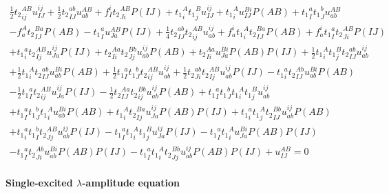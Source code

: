 \begin{gather*}
\frac{1}{2}{t_2}^{AB}_{ij} u^{ij}_{IJ}
+ \frac{1}{2}{t_2}^{ab}_{IJ} u^{AB}_{ab}
+ f^{i}_{I} {t_2}^{AB}_{Ji} P(IJ)
+ {t_1}^{A}_{i} {t_1}^{B}_{j} u^{ij}_{IJ}
+ {t_1}^{A}_{i} u^{Bi}_{IJ} P(AB)
+ {t_1}^{a}_{I} {t_1}^{b}_{J} u^{AB}_{ab} \\
- f^{A}_{a} {t_2}^{Ba}_{IJ} P(AB)
- {t_1}^{a}_{I} u^{AB}_{Ja} P(IJ)   
+ \frac{1}{4}{t_2}^{ab}_{IJ} {t_2}^{AB}_{ij} u^{ij}_{ab}
+ f^{i}_{a} {t_1}^{A}_{i} {t_2}^{Ba}_{IJ} P(AB)
+ f^{i}_{a} {t_1}^{a}_{I} {t_2}^{AB}_{Ji} P(IJ) \\
+ {t_1}^{a}_{i} {t_2}^{AB}_{Ij} u^{ij}_{Ja} P(IJ) 
+ {t_2}^{Aa}_{Ii} {t_2}^{Bb}_{Jj} u^{ij}_{ab} P(AB)
+ {t_2}^{Aa}_{Ii} u^{Bi}_{Ja} P(AB) P(IJ)
+  \frac{1}{2}{t_1}^{A}_{i} {t_1}^{B}_{j} {t_2}^{ab}_{IJ} u^{ij}_{ab} \\
+  \frac{1}{2}{t_1}^{A}_{i} {t_2}^{ab}_{IJ} u^{Bi}_{ab} P(AB)
+  \frac{1}{2}{t_1}^{a}_{I} {t_1}^{b}_{J} {t_2}^{AB}_{ij} u^{ij}_{ab}
+  \frac{1}{2}{t_2}^{ab}_{Ji} {t_2}^{AB}_{Ij} u^{ij}_{ab} P(IJ) 
- {t_1}^{a}_{i} {t_2}^{Ab}_{IJ} u^{Bi}_{ab} P(AB) \\
-  \frac{1}{2}{t_1}^{a}_{I} {t_2}^{AB}_{ij} u^{ij}_{Ja} P(IJ)
-  \frac{1}{2}{t_2}^{Aa}_{IJ} {t_2}^{Bb}_{ij} u^{ij}_{ab} P(AB)
+ {t_1}^{a}_{I} {t_1}^{b}_{J} {t_1}^{A}_{i} {t_1}^{B}_{j} u^{ij}_{ab} \\
+ {t_1}^{a}_{I} {t_1}^{b}_{J} {t_1}^{A}_{i} u^{Bi}_{ab} P(AB)
+ {t_1}^{A}_{i} {t_2}^{Ba}_{Ij} u^{ij}_{Ja} P(AB) P(IJ)
+ {t_1}^{a}_{i} {t_1}^{A}_{j} {t_2}^{Bb}_{IJ} u^{ij}_{ab} P(AB) \\
+ {t_1}^{a}_{i} {t_1}^{b}_{I} {t_2}^{AB}_{Jj} u^{ij}_{ab} P(IJ)
- {t_1}^{a}_{I} {t_1}^{A}_{i} {t_1}^{B}_{j} u^{ij}_{Ja} P(IJ)
- {t_1}^{a}_{I} {t_1}^{A}_{i} u^{Bi}_{Ja} P(AB) P(IJ)  \\
- {t_1}^{a}_{I} {t_2}^{Ab}_{Ji} u^{Bi}_{ab} P(AB) P(IJ)
- {t_1}^{a}_{I} {t_1}^{A}_{i} {t_2}^{Bb}_{Jj} u^{ij}_{ab} P(AB) P(IJ)
+ u^{AB}_{IJ} = 0
\end{gather*}



\paragraph{Single-excited $\lambda$-amplitude equation}

